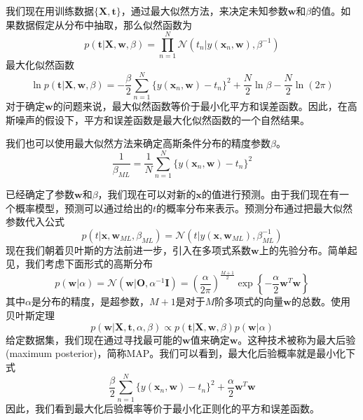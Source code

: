 我们现在用训练数据$\{\boldsymbol{X},\boldsymbol{t}\}$，通过最大似然方法，来决定未知参数$\boldsymbol{w}$和$\beta$的值。如果数据假定从分布中抽取，那么似然函数为
\begin{equation}
	p(\boldsymbol{t}|\boldsymbol{X},\boldsymbol{w},\beta)=\prod_{n=1}^{N}\mathcal{N}(t_n|y(\boldsymbol{x}_n,\boldsymbol{w}),\beta^{-1})
\end{equation}
最大化似然函数
\begin{equation}
	\ln p(\boldsymbol{t}|\boldsymbol{X},\boldsymbol{w},\beta)=-\frac{\beta}{2}\sum_{n=1}^{N}\{y(\boldsymbol{x}_n,\boldsymbol{w})-t_n\}^2+\frac{N}{2}\ln \beta-\frac{N}{2}\ln(2\pi)
\end{equation}
对于确定$\boldsymbol{w}$的问题来说，最大似然函数等价于最小化平方和误差函数。因此，在高斯噪声的假设下，平方和误差函数是最大化似然函数的一个自然结果。

我们也可以使用最大似然方法来确定高斯条件分布的精度参数$\beta$。
\begin{equation}
	\frac{1}{\beta_{ML}}=\frac{1}{N}\sum_{n=1}^{N}\{y(\boldsymbol{x}_n,\boldsymbol{w})-t_n\}^2
\end{equation}

已经确定了参数$\boldsymbol{w}$和$\beta$，我们现在可以对新的$\boldsymbol{x}$的值进行预测。由于我们现在有一个概率模型，预测可以通过给出的$t$的概率分布来表示。预测分布通过把最大似然参数代入公式
\begin{equation}
	p(t|\boldsymbol{x},\boldsymbol{w}_{ML},\beta_{ML})=\mathcal{N}(t|y(\boldsymbol{x},\boldsymbol{w}_{ML}),\beta^{-1}_{ML})	
\end{equation}
现在我们朝着贝叶斯的方法前进一步，引入在多项式系数$\boldsymbol{w}$上的先验分布。简单起见，我们考虑下面形式的高斯分布
\begin{equation}
	p(\boldsymbol{w}|\alpha)=\mathcal{N}(\boldsymbol{w}|\textbf{O},\alpha^{-1}\boldsymbol{I})=\left(\frac{\alpha}{2\pi}\right)^{\frac{M+1}{2}}\exp\left\{-\frac{\alpha}{2}\boldsymbol{w}^T\boldsymbol{w} \right\}
\end{equation}
其中$\alpha$是分布的精度，是超参数，$M+1$是对于$M$阶多项式的向量$\boldsymbol{w}$的总数。使用贝叶斯定理 
\begin{equation}
\label{166}
	p(\boldsymbol{w}|\boldsymbol{X},\boldsymbol{t},\alpha,\beta)\propto p(\boldsymbol{t}|\boldsymbol{X},\boldsymbol{w},\beta)p(\boldsymbol{w}|\alpha)
\end{equation}
给定数据集，我们现在通过寻找最可能的$\boldsymbol{w}$值来确定$\boldsymbol{w}$。这种技术被称为最大后验(maximum posterior)，简称MAP。我们可以看到，最大化后验概率就是最小化下式
\begin{equation}
	\frac{\beta}{2}\sum_{n=1}^{N}\{y(\boldsymbol{x}_n,\boldsymbol{w})-t_n\}^2+\frac{\alpha}{2}\boldsymbol{w}^T\boldsymbol{w}
\end{equation}
因此，我们看到最大化后验概率等价于最小化正则化的平方和误差函数。


